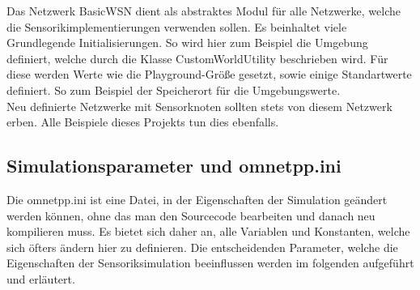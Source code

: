 Das Netzwerk BasicWSN dient als abstraktes Modul für alle Netzwerke, welche die Sensorikimplementierungen verwenden sollen. Es beinhaltet viele Grundlegende Initialisierungen. So wird hier zum Beispiel die Umgebung definiert, welche durch die Klasse CustomWorldUtility beschrieben wird. Für diese werden Werte wie die Playground-Größe gesetzt, sowie einige Standartwerte definiert. So zum Beispiel der Speicherort für die Umgebungswerte.\\
Neu definierte Netzwerke mit Sensorknoten sollten stets von diesem Netzwerk erben. Alle Beispiele dieses Projekts tun dies ebenfalls.

\subsection{Simulationsparameter und omnetpp.ini}

Die omnetpp.ini ist eine Datei, in der Eigenschaften der Simulation geändert werden können, ohne das man den Sourcecode bearbeiten und danach neu kompilieren muss. Es bietet sich daher an, alle Variablen und Konstanten, welche sich öfters ändern hier zu definieren. Die entscheidenden Parameter, welche die Eigenschaften der Sensoriksimulation beeinflussen werden im folgenden aufgeführt und erläutert.

